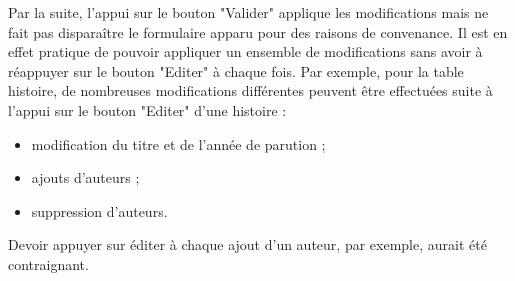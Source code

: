 \documentclass[12pt]{article}
\begin{document}
Par la suite, l'appui sur le bouton "Valider" applique les modifications mais
ne fait pas disparaître le formulaire apparu pour des raisons de convenance.
Il est en effet pratique de pouvoir appliquer un ensemble de modifications
sans avoir à réappuyer sur le bouton "Editer" à chaque fois.
Par exemple, pour la table histoire, de nombreuses modifications différentes
peuvent être effectuées suite à l'appui sur le bouton "Editer" d'une histoire
: 
\begin{itemize}
	\item modification du titre et de l'année de parution ;
	\item ajouts d'auteurs ;
	\item suppression d'auteurs.
\end{itemize}
Devoir appuyer sur éditer à chaque ajout d'un auteur, par exemple, aurait été contraignant.
\end{document}
